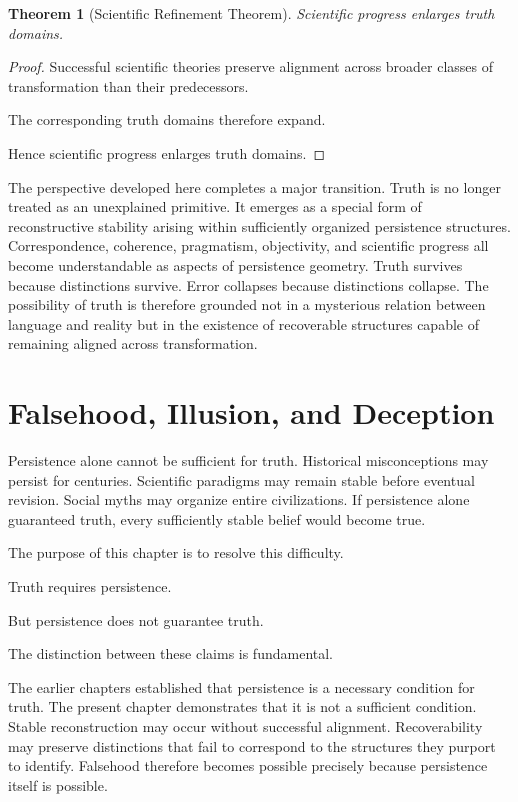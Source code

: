 \documentclass[12pt,oneside]{article}
\newtheorem{theorem}{Theorem}[section] \newtheorem{lemma}[theorem]{Lemma} \newtheorem{proposition}[theorem]{Proposition} \newtheorem{corollary}[theorem]{Corollary}
\theoremstyle{definition}
\begin{document}
\begin{theorem}[Scientific Refinement Theorem]

Scientific progress enlarges truth domains.

\end{theorem}

\begin{proof}

Successful scientific theories preserve alignment across broader classes of transformation than their predecessors.

The corresponding truth domains therefore expand.

Hence scientific progress enlarges truth domains.

\end{proof}

The perspective developed here completes a major transition. Truth is no longer treated as an unexplained primitive. It emerges as a special form of reconstructive stability arising within sufficiently organized persistence structures. Correspondence, coherence, pragmatism, objectivity, and scientific progress all become understandable as aspects of persistence geometry. Truth survives because distinctions survive. Error collapses because distinctions collapse. The possibility of truth is therefore grounded not in a mysterious relation between language and reality but in the existence of recoverable structures capable of remaining aligned across transformation.

\section{Falsehood, Illusion, and Deception}

Persistence alone cannot be sufficient for truth. Historical misconceptions may persist for centuries. Scientific paradigms may remain stable before eventual revision. Social myths may organize entire civilizations. If persistence alone guaranteed truth, every sufficiently stable belief would become true.

The purpose of this chapter is to resolve this difficulty.

Truth requires persistence.

But persistence does not guarantee truth.

The distinction between these claims is fundamental.

The earlier chapters established that persistence is a necessary condition for truth. The present chapter demonstrates that it is not a sufficient condition. Stable reconstruction may occur without successful alignment. Recoverability may preserve distinctions that fail to correspond to the structures they purport to identify. Falsehood therefore becomes possible precisely because persistence itself is possible.
\end{document}
